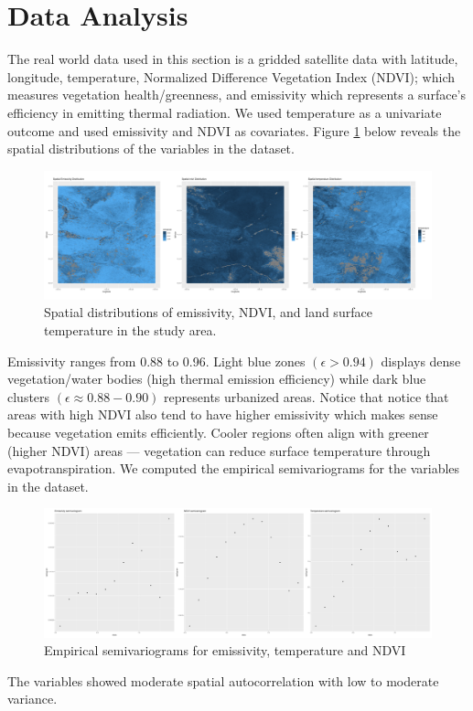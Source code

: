 \section{Data Analysis}
\label{sec:data analysis}
The real world data used in this section is a gridded satellite data with latitude, longitude, temperature, Normalized Difference Vegetation Index (NDVI); which measures vegetation health/greenness, and emissivity which represents a surface's efficiency in emitting thermal radiation. We used temperature as a univariate outcome and used emissivity and NDVI as covariates.
Figure \ref{fig:spatialpatterns} below reveals the spatial  distributions of the variables in the dataset.

 \begin{figure}[h]
 \centering
 \includegraphics[width=\textwidth]{../../figures/spatial_horizontal_stack.png}
 \caption{
   Spatial distributions of emissivity, NDVI, and  land surface temperature in the study area. 
 }
 \label{fig:spatialpatterns}
 \end{figure}
 
 Emissivity ranges from 0.88 to 0.96. Light blue zones $(\epsilon > 0.94)$ displays dense vegetation/water bodies (high thermal emission efficiency)
 while dark blue clusters $(\epsilon \approx 0.88-0.90)$ represents urbanized areas. Notice that notice that areas with high NDVI also tend to have higher emissivity which makes sense because vegetation emits efficiently.
 Cooler regions often align with greener (higher NDVI) areas — vegetation can reduce surface temperature through evapotranspiration. \newline
 We computed the empirical semivariograms for the variables in the dataset. 
 \begin{figure}[h]
 \centering
 \includegraphics[width=\textwidth]{../../figures/semivariograms.png}
 \caption{Empirical semivariograms for emissivity, temperature and NDVI}
 \label{fig:semivariograms}
 \end{figure}
The variables showed moderate spatial autocorrelation with low to moderate variance.
